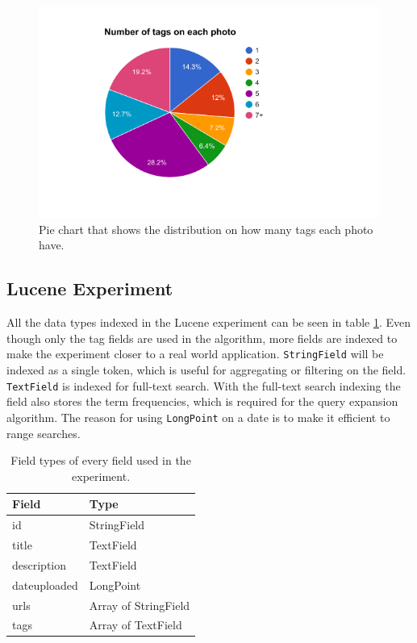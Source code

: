 \begin{figure}[h!]
  \centering \includegraphics[width=1\linewidth]{img/number-of-tags-distribution.png}
  \caption{Pie chart that shows the distribution on how many tags each photo have.}
  \label{fig:pie-chart-tag-distribution}
\end{figure}

\subsection{Lucene Experiment}
All the data types indexed in the Lucene experiment can be seen in table \ref{tbl:lucene-field-types}.
Even though only the tag fields are used in the algorithm,
more fields are indexed to make the experiment closer to a real world application.
\texttt{StringField} will be indexed as a single token,
which is useful for aggregating or filtering on the field.
\texttt{TextField} is indexed for full-text search.
With the full-text search indexing the field also stores the term frequencies,
which is required for the query expansion algorithm.
The reason for using \texttt{LongPoint} on a date is to make it efficient to range searches.

\begin{table}[h!]
    \begin{tabular}{|l|l|}
    \hline
    \textbf{Field} & \textbf{Type}      \\ \hline
    id           & StringField          \\ \hline
    title        & TextField            \\ \hline
    description  & TextField            \\ \hline
    dateuploaded & LongPoint            \\ \hline
    urls         & Array of StringField \\ \hline
    tags         & Array of TextField   \\ \hline
    \end{tabular}
    \centering
    \caption{Field types of every field used in the experiment.}
    \label{tbl:lucene-field-types}
\end{table}

